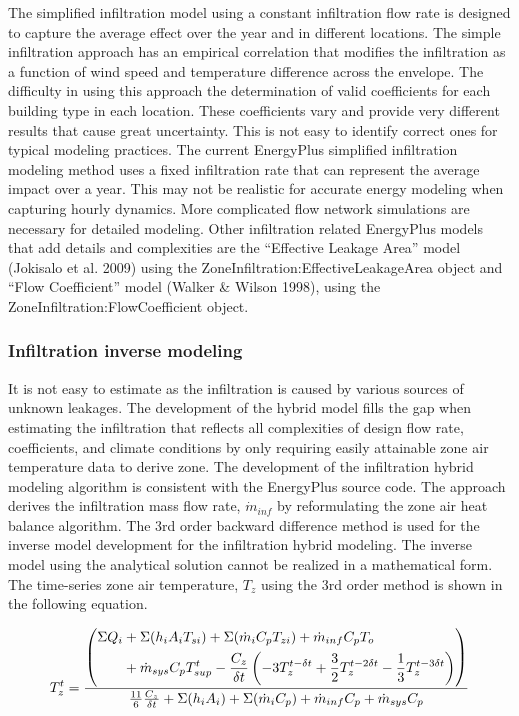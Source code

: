 The simplified infiltration model using a constant infiltration flow rate is designed to capture the average effect over the year and in different locations. The simple infiltration approach has an empirical correlation that modifies the infiltration as a function of wind speed and temperature difference across the envelope. The difficulty in using this approach the determination of valid coefficients for each building type in each location. These coefficients vary and provide very different results that cause great uncertainty. This is not easy to identify correct ones for typical modeling practices. The current EnergyPlus simplified infiltration modeling method uses a fixed infiltration rate that can represent the average impact over a year. This may not be realistic for accurate energy modeling when capturing hourly dynamics. More complicated flow network simulations are necessary for detailed modeling. Other infiltration related EnergyPlus models that add details and complexities are the ``Effective Leakage Area'' model (Jokisalo et al. 2009) using the ZoneInfiltration:EffectiveLeakageArea object  and ``Flow Coefficient'' model (Walker \& Wilson 1998), using the ZoneInfiltration:FlowCoefficient object.

\subsubsection{Infiltration inverse modeling}\label{Infiltration inverse modeling}

It is not easy to estimate as the infiltration is caused by various sources of unknown leakages. The development of the hybrid model fills the gap when estimating the infiltration that reflects all complexities of design flow rate, coefficients, and climate conditions by only requiring easily attainable zone air temperature data to derive zone. The development of the infiltration hybrid modeling algorithm is consistent with the EnergyPlus source code. The approach derives the infiltration mass flow rate, $\dot{m}_{inf}$ by reformulating the zone air heat balance algorithm. The 3rd order backward difference method is used for the inverse model development for the infiltration hybrid modeling. The inverse model using the analytical solution cannot be realized in a mathematical form. The time-series zone air temperature, $T_z$ using the 3rd order method is shown in the following equation.

\begin{equation}
T_z^t = \\ \frac {\left(\begin{aligned}\Sigma Q_i &+ \Sigma(h_i A_i T_{si}) + \Sigma (\dot{m}_i C_p T_{zi}) + \dot{m}_{inf} C_p T_o\\ &+ \dot{m}_{sys} C_p T_{sup}^t - \frac{C_z}{\delta t}\left(-3T_z^{t-\delta t} + \frac {3} {2} T_z^{t-2\delta t} - \frac {1} {3} T_z^{t-3\delta t}\right)\end{aligned}\right)} { \frac {11}{6} \frac {C_z} {\delta t} + \Sigma (h_i A_i)  + \Sigma (\dot{m}_i C_p) + \dot{m}_{inf} C_p + \dot{m}_{sys} C_p}
\end{equation}

